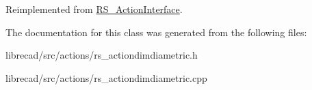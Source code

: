 Reimplemented from \hyperlink{classRS__ActionInterface_a16c2d17c24c1131d88360abbdfcc1d63}{R\-S\-\_\-\-Action\-Interface}.



The documentation for this class was generated from the following files\-:\begin{DoxyCompactItemize}
\item 
librecad/src/actions/rs\-\_\-actiondimdiametric.\-h\item 
librecad/src/actions/rs\-\_\-actiondimdiametric.\-cpp\end{DoxyCompactItemize}
